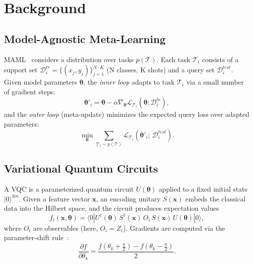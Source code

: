\documentclass[a4paper,nopdfoutputerror]{quantumarticle}
\begin{document}
\section{Background}
\label{sec:background}

\subsection{Model-Agnostic Meta-Learning}

MAML~\cite{finn2017maml} considers a distribution over tasks
$p(\mathcal{T})$.
Each task $\mathcal{T}_i$ consists of a support set
$\mathcal{D}_i^{tr} = \{(x_j, y_j)\}_{j=1}^{N \cdot K}$
(N classes, K shots) and a query set $\mathcal{D}_i^{test}$.
Given model parameters $\boldsymbol{\theta}$, the \emph{inner loop} adapts
to task $\mathcal{T}_i$ via a small number of gradient steps:
\begin{equation}
  \boldsymbol{\theta}'_i = \boldsymbol{\theta}
    - \alpha \nabla_{\boldsymbol{\theta}} \mathcal{L}_{\mathcal{T}_i}
      (\boldsymbol{\theta}; \mathcal{D}_i^{tr}),
\end{equation}
and the \emph{outer loop} (meta-update) minimizes the expected query loss
over adapted parameters:
\begin{equation}
  \min_{\boldsymbol{\theta}} \sum_{\mathcal{T}_i \sim p(\mathcal{T})}
    \mathcal{L}_{\mathcal{T}_i}(\boldsymbol{\theta}'_i;\, \mathcal{D}_i^{test}).
\end{equation}

\subsection{Variational Quantum Circuits}

A VQC is a parameterized quantum circuit $U(\boldsymbol{\theta})$ applied
to a fixed initial state $|0\rangle^{\otimes n}$.
Given a feature vector $\mathbf{x}$, an encoding unitary
$S(\mathbf{x})$ embeds the classical data into the Hilbert space, and
the circuit produces expectation values
\begin{equation}
  f_i(\mathbf{x}, \boldsymbol{\theta}) = \langle 0 |
    U^\dagger(\boldsymbol{\theta})\, S^\dagger(\mathbf{x})\,
    O_i\,
    S(\mathbf{x})\, U(\boldsymbol{\theta})
  | 0 \rangle,
\end{equation}
where $O_i$ are observables (here, $O_i = Z_i$).
Gradients are computed via the parameter-shift
rule~\cite{mitarai2018quantum}:
\begin{equation}
  \frac{\partial f}{\partial \theta_k}
    = \frac{f(\theta_k + \tfrac{\pi}{2}) - f(\theta_k - \tfrac{\pi}{2})}{2}.
\end{equation}
\end{document}
